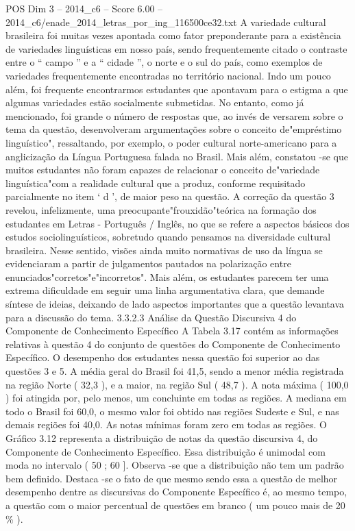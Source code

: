 \begin{textsample}{POS Dim 3 – 2014\_c6 – Score 6.00 – 2014\_c6/enade\_2014\_letras\_por\_ing\_116500ce32.txt}
A variedade cultural brasileira foi muitas vezes apontada como fator preponderante para a existência de variedades linguísticas em nosso país, sendo frequentemente citado o contraste entre o “ campo ” e a “ cidade ”, o norte e o sul do país, como exemplos de variedades frequentemente encontradas no território nacional.
Indo um pouco além, foi frequente encontrarmos estudantes que apontavam para o estigma a que algumas variedades estão socialmente submetidas.
No entanto, como já mencionado, foi grande o número de respostas que, ao invés de versarem sobre o tema da questão, desenvolveram argumentações sobre o conceito de"empréstimo linguístico", ressaltando, por exemplo, o poder cultural norte-americano para a anglicização da Língua Portuguesa falada no Brasil.
Mais além, constatou -se que muitos estudantes não foram capazes de relacionar o conceito de"variedade linguística"com a realidade cultural que a produz, conforme requisitado parcialmente no item ‘ d ’, de maior peso na questão.
A correção da questão 3 revelou, infelizmente, uma preocupante"frouxidão"teórica na formação dos estudantes em Letras - Português / Inglês, no que se refere a aspectos básicos dos estudos sociolinguísticos, sobretudo quando pensamos na diversidade cultural brasileira.
Nesse sentido, visões ainda muito normativas de uso da língua se evidenciaram a partir de julgamentos pautados na polarização entre enunciados"corretos"e"incorretos".
Mais além, os estudantes parecem ter uma extrema dificuldade em seguir uma linha argumentativa clara, que demande síntese de ideias, deixando de lado aspectos importantes que a questão levantava para a discussão do tema. 3.3.2.3 Análise da Questão Discursiva 4 do Componente de Conhecimento Específico A Tabela 3.17 contém as informações relativas à questão 4 do conjunto de questões do Componente de Conhecimento Específico.
O desempenho dos estudantes nessa questão foi superior ao das questões 3 e 5.
A média geral do Brasil foi 41,5, sendo a menor média registrada na região Norte ( 32,3 ), e a maior, na região Sul ( 48,7 ).
A nota máxima ( 100,0 ) foi atingida por, pelo menos, um concluinte em todas as regiões.
A mediana em todo o Brasil foi 60,0, o mesmo valor foi obtido nas regiões Sudeste e Sul, e nas demais regiões foi 40,0.
As notas mínimas foram zero em todas as regiões.
O Gráfico 3.12 representa a distribuição de notas da questão discursiva 4, do Componente de Conhecimento Específico.
Essa distribuição é unimodal com moda no intervalo ( 50 ; 60 ].
Observa -se que a distribuição não tem um padrão bem definido.
Destaca -se o fato de que mesmo sendo essa a questão de melhor desempenho dentre as discursivas do Componente Específico é, ao mesmo tempo, a questão com o maior percentual de questões em branco ( um pouco mais de 20 \% ).

\end{textsample}
